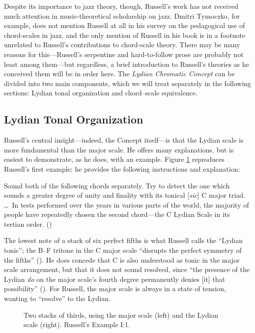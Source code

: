 Despite its importance to jazz theory, though, Russell's work has not received
much attention in music-theoretical scholarship on jazz. Dmitri Tymoczko, for
example, does not mention Russell at all in his survey on the pedagogical use
of chord-scales in jazz, and the only mention of Russell in his book is in a
footnote unrelated to Russell's contributions to chord-scale theory.
There may be many reasons for this---Russell's serpentine and hard-to-follow
prose are probably not least among them---but regardless, a brief introduction
to Russell's theories as he conceived them will be in order here. The
\emph{Lydian Chromatic Concept} can be divided into two main components, which
we will treat separately in the following sections: Lydian tonal organization and
chord--scale equivalence.

\subsection{Lydian Tonal Organization}
\label{subsec:lydian-org}

Russell's central insight---indeed, the Concept itself---is that the
Lydian scale is more fundamental than the major scale. He offers many
explanations, but is easiest to demonstrate, as he does, with an example.
Figure \ref{lcc:tertian-stacks} reproduces Russell's first example; he
provides the following instructions and explanation:%
%
\begin{quoting}
  \singlespacing
  Sound both of the following chords separately. Try to detect the one which
  sounds a greater degree of unity and finality with its tonical [\emph{sic}] C
  major triad. \ldots\ In tests performed over the years in various parts of the
  world, the majority of people have repeatedly chosen the second chord---the C
  Lydian Scale in its tertian order. ()
\end{quoting}%
%
The lowest note of a stack of six perfect fifths is what Russell calls the
``Lydian tonic''; the B--F tritone in the C major scale ``disrupts the perfect
symmetry of the fifths'' (). He does concede that C is also understood as
tonic in the major scale arrangement, but that it does not sound resolved,
since ``the presence of the Lydian \emph{do} on the major scale's fourth
degree permanently denies [it] that possibility'' (). For
Russell, the major scale is always in a state of tension, wanting to
``resolve'' to the Lydian.

\begin{figure}[tbp]
  \caption[Two stacks of thirds, using the major scale and the Lydian
    scale.]{Two stacks of thirds, using the major scale (left) and the Lydian
    scale (right). Russell's Example I:1.}
  \label{lcc:tertian-stacks}
\end{figure}

